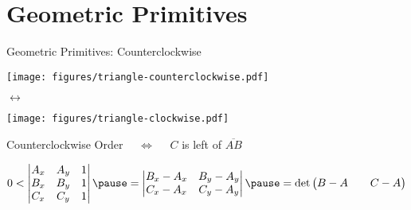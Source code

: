 \documentclass[aspectratio=169]{beamer}
\begin{document}
\section{Geometric Primitives}
\begin{frame}{Geometric Primitives: Counterclockwise}
  \begin{minipage}[c]{0.4\textwidth}
      \centering
      \texttt{[image: figures/triangle-counterclockwise.pdf]}
  \end{minipage}
  \hfill
  $\longleftrightarrow$
  \hfill
  \begin{minipage}[c]{0.4\textwidth}
      \centering
      \texttt{[image: figures/triangle-clockwise.pdf]}
  \end{minipage}

  Counterclockwise Order
  \pause
  $\quad\iff\quad$ $C$ is left of $\overline{AB}$

  \bigskip

  \pause
  \begin{mybox}
  \[
    0 <
    \begin{vmatrix}
      A_x & A_y & 1 \\
      B_x & B_y & 1 \\
      C_x & C_y & 1 \\
    \end{vmatrix}
    \pause
    =
    \begin{vmatrix}
      B_x - A_x & B_y - A_y \\
      C_x - A_x & C_y - A_y \\
    \end{vmatrix}
    \pause
    =
    \det
    \begin{pmatrix}
      B-A && C-A
    \end{pmatrix}
  \]
  \end{mybox}
\end{frame}
\end{document}
